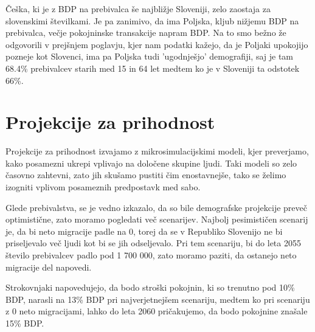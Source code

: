 \documentclass[12pt, a4paper]{article}
\begin{document}
Češka, ki je z BDP na prebivalca še najbližje Sloveniji, zelo zaostaja za slovenskimi številkami. Je pa zanimivo, da ima Poljska, kljub nižjemu BDP na prebivalca, večje pokojninske transakcije napram BDP. Na to smo bežno že odgovorili v prejšnjem poglavju, kjer nam podatki kažejo, da je Poljaki upokojijo pozneje kot Slovenci, ima pa Poljska tudi 'ugodnješjo' demografiji, saj je tam 68.4\% prebivalcev starih med 15 in 64 let medtem ko je v Sloveniji ta odstotek 66\%.

\newpage

\section[Projekcije za prihodnost]{Projekcije za prihodnost}

Projekcije za prihodnost izvajamo z mikrosimulacijskimi modeli, kjer preverjamo, kako posamezni ukrepi vplivajo na določene skupine ljudi. Taki modeli so zelo časovno zahtevni, zato jih skušamo pustiti čim enostavnejše, tako se želimo izogniti vplivom posameznih predpostavk med sabo.

\hspace*{5mm} Glede prebivalstva, se je vedno izkazalo, da so bile demografske projekcije preveč optimistične, zato moramo pogledati več scenarijev. Najbolj pesimističen scenarij je, da bi neto migracije padle na 0, torej da se v Republiko Slovenijo ne bi priseljevalo več ljudi kot bi se jih odseljevalo. Pri tem scenariju, bi do leta 2055 število prebivalcev padlo pod 1 700 000, zato moramo paziti, da ostanejo neto migracije del napovedi.

\hspace*{5mm} Strokovnjaki napovedujejo, da bodo stroški pokojnin, ki so trenutno pod 10\% BDP, narasli na 13\% BDP pri najverjetnejšem scenariju, medtem ko pri scenariju z 0 neto migracijami, lahko do leta 2060 pričakujemo, da bodo pokojnine znašale 15\% BDP.

\newpage
\end{document}
